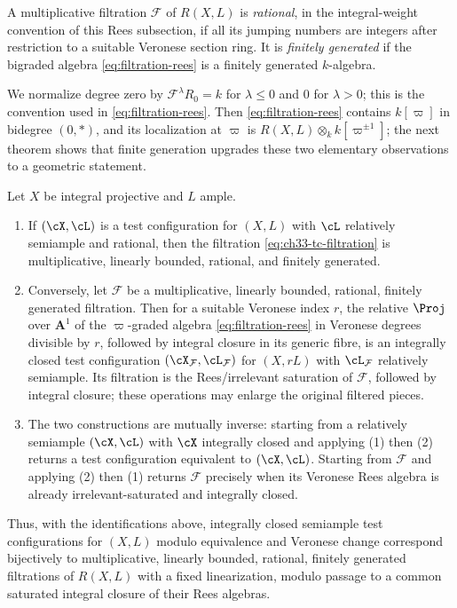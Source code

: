 \begin{definition}
\label{def:ch33-fg-filtration}
A multiplicative filtration $\mathcal F$ of $R(X,L)$ is
\emph{rational}, in the integral-weight convention of this Rees subsection,
if all its jumping numbers are integers after restriction to a suitable
Veronese section ring.  It is \emph{finitely generated} if the bigraded algebra
\eqref{eq:filtration-rees} is a finitely generated $k$-algebra.
\end{definition}

We normalize degree zero by
$\mathcal F^\lambda R_0=k$ for $\lambda\leq0$ and $0$ for $\lambda>0$;
this is the convention used in \eqref{eq:filtration-rees}.
Then \eqref{eq:filtration-rees} contains
$k[\varpi]$ in bidegree $(0,\ast)$, and its localization at
$\varpi$ is $R(X,L)\otimes_kk[\varpi^{\pm1}]$; the next theorem shows
that finite generation upgrades these two elementary
observations to a geometric statement.

\begin{theorem}
\label{thm:ch33-fg-filtration-tc}
Let $X$ be integral projective and $L$ ample.
\begin{enumerate}
\item If $(\cX,\cL)$ is a test configuration for $(X,L)$ with $\cL$
 relatively semiample and rational, then the filtration
 \eqref{eq:ch33-tc-filtration} is multiplicative, linearly bounded,
 rational, and finitely generated.
\item Conversely, let $\mathcal F$ be a multiplicative, linearly bounded,
 rational, finitely generated filtration.  Then for a suitable Veronese
 index $r$, the relative $\Proj$ over $\mathbf A^1$ of the
 $\varpi$-graded algebra \eqref{eq:filtration-rees} in Veronese degrees
 divisible by $r$, followed by integral closure in its generic fibre, is
 an integrally closed test configuration $(\cX_{\mathcal F},\cL_{\mathcal
 F})$ for $(X,rL)$ with $\cL_{\mathcal F}$ relatively semiample.  Its
 filtration is the Rees/irrelevant saturation of $\mathcal F$, followed
 by integral closure; these operations may enlarge the original filtered
 pieces.
\item The two constructions are mutually inverse: starting from a
 relatively semiample $(\cX,\cL)$ with $\cX$ integrally closed and
 applying (1) then (2) returns a test configuration equivalent to
 $(\cX,\cL)$.  Starting from $\mathcal F$ and applying (2) then (1)
 returns $\mathcal F$ precisely when its Veronese Rees algebra is already
 irrelevant-saturated and integrally closed.
\end{enumerate}
Thus, with the identifications above, integrally closed semiample test
configurations for $(X,L)$ modulo equivalence and Veronese change
correspond bijectively to multiplicative, linearly bounded, rational,
finitely generated filtrations of $R(X,L)$ with a fixed linearization,
modulo passage to a common saturated integral closure of their Rees
algebras.
\end{theorem}

